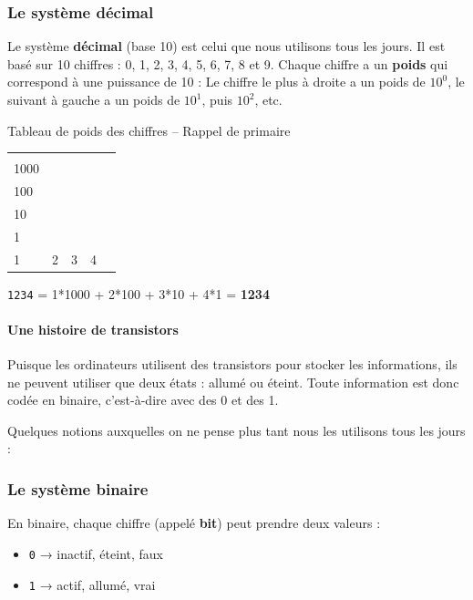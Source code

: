 \subsubsection{Le système décimal}
Le système \textbf{décimal} (base 10) est celui que nous utilisons tous les jours. Il est basé sur 10 chiffres : 0, 1, 2, 3, 4, 5, 6, 7, 8 et 9. Chaque chiffre a un \textbf{poids} qui correspond à une puissance de 10 :	
Le chiffre le plus à droite a un poids de $10^0$, le suivant à gauche a un poids de $10^1$, puis $10^2$, etc.
\begin{UPSTIexemples}{Tableau de poids des chiffres -- Rappel de primaire}
	\begin{center}
		\begin{tabular}{|l|l|l|l|l|}
			\hline
			\makecell[tl]{$10^{3}$         \\ 1000} & \makecell[tl]{$10^{2}$\\  100} & \makecell[tl]{$10^{1}$\\ 10} & \makecell[tl]{$10^{0}$ \\1} \\
			\hline
			1 & 2 & 3 & 4 \\
			\hline
		\end{tabular}
	\end{center}
	\texttt{1234} = 1*1000 + 2*100 + 3*10 + 4*1 = \textbf{1234}
\end{UPSTIexemples}

\paragraph{Une histoire de transistors}
Puisque les ordinateurs utilisent des transistors pour stocker les informations, ils ne peuvent utiliser que deux états : allumé ou éteint. Toute information est donc codée en binaire, c'est-à-dire avec des 0 et des 1. 

Quelques notions auxquelles on ne pense plus tant nous les utilisons tous les jours : 

\subsubsection{Le système binaire}

En binaire, chaque chiffre (appelé \textbf{bit}) peut prendre deux valeurs :
\begin{itemize}
	\item \texttt{0} → inactif, éteint, faux
	\item \texttt{1} → actif, allumé, vrai
\end{itemize}

